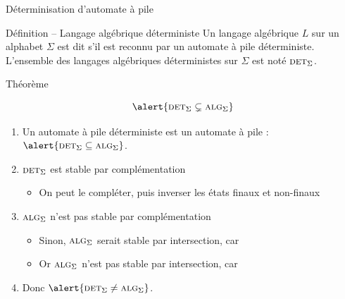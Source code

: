 
\begingroup

\begin{frame}{Déterminisation d'automate à pile}

  \begin{block}{Définition -- Langage algébrique déterministe}
    Un langage algébrique $L$ sur un alphabet $\Sigma$ est dit  s'il est \alert{reconnu par un automate à pile déterministe}.\\
    L'ensemble des langages algébriques déterministes sur $\Sigma$ est noté \alert{$\textsc{det}_\Sigma$}.
  \end{block}
  
  \begin{block}{Théorème}
    
    \vspace{-4mm}
    $$\alert{\textsc{det}_\Sigma \subsetneq \textsc{alg}_\Sigma}$$

    \vspace{-1mm}
    \begin{enumerate}
    \item Un automate à pile déterministe est un automate à pile : $\alert{\textsc{det}_\Sigma \subseteq \textsc{alg}_\Sigma}$.
    \item $\textsc{det}_\Sigma$ est stable par complémentation
      \begin{itemize}
      \item On peut le compléter, puis inverser les états finaux et non-finaux
      \end{itemize}
    \item $\textsc{alg}_\Sigma$ n'est pas stable par complémentation
      \begin{itemize}
      \item Sinon, $\textsc{alg}_\Sigma$ serait stable par intersection, car 
      \item Or $\textsc{alg}_\Sigma$ n'est pas stable par intersection, car 
      \end{itemize}
    \item Donc $\alert{\textsc{det}_\Sigma \neq \textsc{alg}_\Sigma}$.
    \end{enumerate}
  \end{block}

\end{frame}

\endgroup
\endinput
